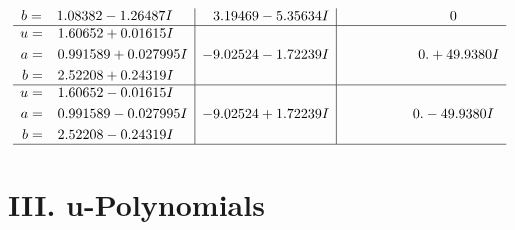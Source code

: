 \documentclass[1p]{elsarticle_modified}
\theoremstyle{definition}
\begin{document}
$$\begin{array}{c|c|c}
\begin{aligned}
b &= \phantom{-}1.08382 - 1.26487 I\end{aligned}
 & \phantom{-}3.19469 - 5.35634 I & \phantom{-0.000000 } 0 \\ \hline\begin{aligned}
u &= \phantom{-}1.60652 + 0.01615 I \\
a &= \phantom{-}0.991589 + 0.027995 I \\
b &= \phantom{-}2.52208 + 0.24319 I\end{aligned}
 & -9.02524 - 1.72239 I & \phantom{-0.000000 -}0. + 49.9380 I \\ \hline\begin{aligned}
u &= \phantom{-}1.60652 - 0.01615 I \\
a &= \phantom{-}0.991589 - 0.027995 I \\
b &= \phantom{-}2.52208 - 0.24319 I\end{aligned}
 & -9.02524 + 1.72239 I & \phantom{-0.000000 } 0. - 49.9380 I\\
 \hline 
 \end{array}$$\newpage
\newpage\renewcommand{\arraystretch}{1}
\centering \section*{ III. u-Polynomials}
\end{document}
